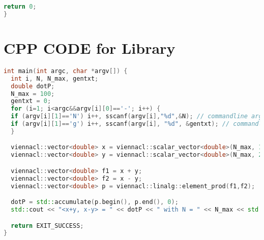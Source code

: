 \begin{appendix}
\begin{lstlisting}[language=C++, title=CPP CODE for \fun{VexCL} Library]
  return 0; 
}
\end{lstlisting}
\pagebreak


\section{CPP CODE for  Library}
\label{app_1d}
\begin{lstlisting}[language=C++, title=CPP CODE for \fun{ViennaCL} Library]
int main(int argc, char *argv[]) {
  int i, N, N_max, gentxt;
  double dotP;
  N_max = 100;
  gentxt = 0;
  for (i=1; i<argc&&argv[i][0]=='-'; i++) {
  if (argv[i][1]=='N') i++, sscanf(argv[i],"%d",&N); // commandline arg -N for adjusting max. count, if none given N=100
  if (argv[i][1]=='g') i++, sscanf(argv[i], "%d", &gentxt); // commandline arg. -g for generating a txt, if none given, no .txt NOT IMPLEMENTED
  }

  viennacl::vector<double> x = viennacl::scalar_vector<double>(N_max, 1.0);
  viennacl::vector<double> y = viennacl::scalar_vector<double>(N_max, 2.0);

  viennacl::vector<double> f1 = x + y;
  viennacl::vector<double> f2 = x - y;
  viennacl::vector<double> p = viennacl::linalg::element_prod(f1,f2);

  dotP = std::accumulate(p.begin(), p.end(), 0);
  std::cout << "<x+y, x-y> = " << dotP << " with N = " << N_max << std::endl;

  return EXIT_SUCCESS;
}
\end{lstlisting}


\end{appendix}

